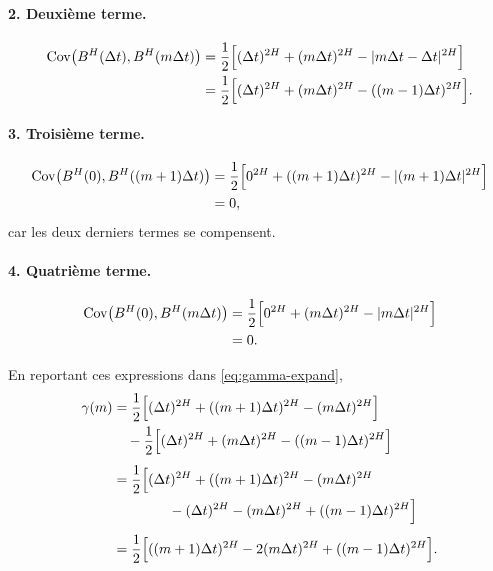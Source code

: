 \documentclass[11pt,a4paper]{article}
\newcommand{\Cov}{\mathrm{Cov}}
\newcommand{\1}{\mathbf{1}}
\newcommand{\bH}{B^{H}}
\begin{document}
\paragraph{2. Deuxième terme.}
\begin{align}
  \Cov\bigl(\bH(\Delta t),\bH(m\Delta t)\bigr)
  &= \frac{1}{2}\Bigl[(\Delta t)^{2H}
  + (m\Delta t)^{2H}
  - |m\Delta t - \Delta t|^{2H}\Bigr] \\
  &= \frac{1}{2}\Bigl[(\Delta t)^{2H}
  + (m\Delta t)^{2H}
  - ((m-1)\Delta t)^{2H}\Bigr].
\end{align}

\paragraph{3. Troisième terme.}
\begin{align}
  \Cov\bigl(\bH(0),\bH((m+1)\Delta t)\bigr)
  &= \frac{1}{2}\Bigl[0^{2H}
  + ((m+1)\Delta t)^{2H}
  - |(m+1)\Delta t|^{2H}\Bigr] \\
  &= 0,
\end{align}
car les deux derniers termes se compensent.

\paragraph{4. Quatrième terme.}
\begin{align}
  \Cov\bigl(\bH(0),\bH(m\Delta t)\bigr)
  &= \frac{1}{2}\Bigl[0^{2H}
  + (m\Delta t)^{2H}
  - |m\Delta t|^{2H}\Bigr] \\
  &= 0.
\end{align}

En reportant ces expressions dans \eqref{eq:gamma-expand},
\begin{align}
  \gamma(m)
  &= \frac{1}{2}\Bigl[(\Delta t)^{2H}
  + ((m+1)\Delta t)^{2H}
  - (m\Delta t)^{2H}\Bigr] \\
  &\quad - \frac{1}{2}\Bigl[(\Delta t)^{2H}
  + (m\Delta t)^{2H}
  - ((m-1)\Delta t)^{2H}\Bigr] \\[0.4em]
  &= \frac{1}{2}\Bigl[(\Delta t)^{2H}
                      + ((m+1)\Delta t)^{2H}
                      - (m\Delta t)^{2H} \\
  &\qquad\qquad
        - (\Delta t)^{2H}
        - (m\Delta t)^{2H}
        + ((m-1)\Delta t)^{2H}\Bigr] \\[0.4em]
  &= \frac{1}{2}\Bigl[((m+1)\Delta t)^{2H}
        - 2(m\Delta t)^{2H}
        + ((m-1)\Delta t)^{2H}\Bigr].
\end{align}
\end{document}
